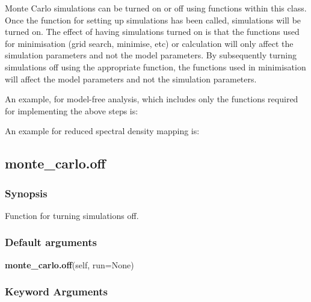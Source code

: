 Monte Carlo simulations can be turned on or off using functions within this class.  Once the
function for setting up simulations has been called, simulations will be turned on.  The
effect of having simulations turned on is that the functions used for minimisation (grid
search, minimise, etc) or calculation will only affect the simulation parameters and not the
model parameters.  By subsequently turning simulations off using the appropriate function,
the functions used in minimisation will affect the model parameters and not the simulation
parameters.


An example, for model-free analysis, which includes only the functions required for
implementing the above steps is:




An example for reduced spectral density mapping is:





\newpage

\subsection{monte\_carlo.off}


\subsubsection{Synopsis}

Function for turning simulations off.

\subsubsection{Default arguments}

\textsf{\textbf{monte\_carlo.off}(self, run=None)}


\subsubsection{Keyword Arguments}


